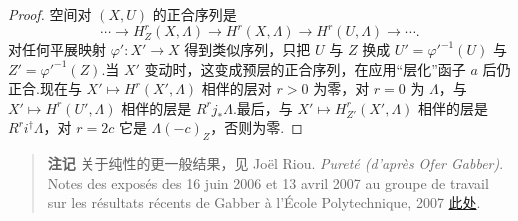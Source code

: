\begin{proof}
空间对 $(X, U)$ 的正合序列是
\[
\cdots \to H^{r}_{Z}(X, \Lambda) \to H^{r}(X, \Lambda) \to H^{r}(U, \Lambda) \to \cdots.
\]
对任何平展映射 $\varphi' \colon X' \to X$ 得到类似序列，只把 $U$ 与 $Z$ 换成 $U' = \varphi'^{-1}(U)$ 与 $Z' = \varphi'^{-1}(Z)$.当 $X'$ 变动时，这变成预层的正合序列，在应用``层化''函子 $a$ 后仍正合.现在与 $X' \mapsto H^{r}(X', \Lambda)$ 相伴的层对 $r > 0$ 为零，对 $r = 0$ 为 $\Lambda$，与 $X' \mapsto H^{r}(U', \Lambda)$ 相伴的层是 $R^{r}j_{*}\Lambda$.最后，与 $X' \mapsto H^{r}_{Z'}(X', \Lambda)$ 相伴的层是 $R^{r}i^{\dagger}\Lambda$，对 $r = 2c$ 它是 $\Lambda(-c)_Z$，否则为零.
\end{proof}

\begin{quote}
\textbf{注记} 关于纯性的更一般结果，见 Jo\"el Riou. \emph{Puret\'e (d'apr\`es Ofer Gabber)}. Notes des expos\'es des 16 juin 2006 et 13 avril 2007 au groupe de travail sur les r\'esultats r\'ecents de Gabber \`a l'\'Ecole Polytechnique, 2007 \href{http://www.math.u-psud.fr/~riou/doc/gysin.pdf}{此处}.
\end{quote}
